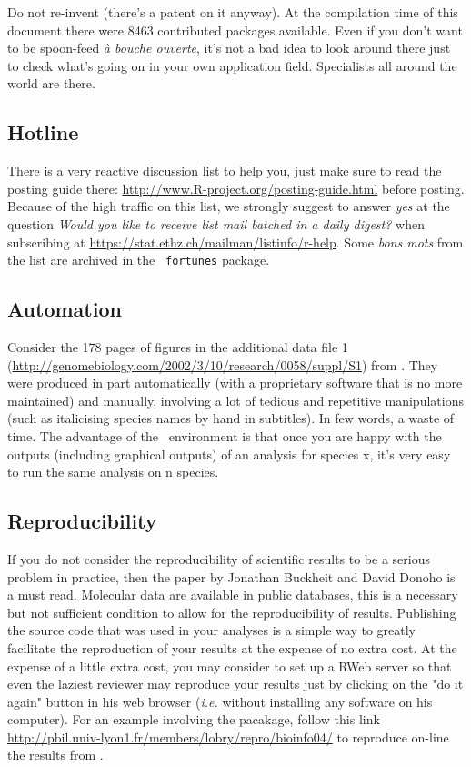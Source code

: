 \documentclass{article}
\begin{document}
Do not re-invent (there's a patent \cite{wheel} on it anyway).
At the compilation time of this document there were 
8463
contributed packages available. Even if you don't want to be spoon-feed 
\textit{{\`a} bouche ouverte}, 
it's not a bad
idea to look around there just to check what's going on in your own application field.
Specialists all around the world are there.

\subsection{Hotline}

There is a very reactive discussion list to help you, just make sure to
read the posting guide there: \url{http://www.R-project.org/posting-guide.html}
before posting. Because of the high traffic on this list, we strongly suggest to answer \emph{yes} at the
question \emph{Would you like to receive list mail batched in a daily  digest?} when
subscribing at \url{https://stat.ethz.ch/mailman/listinfo/r-help}. Some \textit{bons mots}
from the list are archived in the \Rlogo{}~\texttt{fortunes} package.

\subsection{Automation} 
Consider the 178 pages of figures in the additional data file 1
(\url{http://genomebiology.com/2002/3/10/research/0058/suppl/S1}) from \cite{lobrysueoka}. 
They were produced in part automatically (with a proprietary
software that is no more maintained) and manually, involving a lot of
tedious and repetitive manipulations (such as italicising species names by hand in subtitles).
In few words, a waste of time. The advantage of the \Rlogo{}~environment is that once you are
happy with the outputs (including graphical outputs) of an analysis for species x, it's very
easy to run the same analysis on n species. 

\subsection{Reproducibility} 
If you do not consider the reproducibility of scientific results
to be a serious problem in practice, then the paper by Jonathan Buckheit and David Donoho
\cite{repro} is a must read. Molecular data are available in public databases, this is
a necessary but not sufficient condition to allow for the reproducibility of results.
Publishing the \Rlogo{} source code that was used in your analyses is a simple way
to greatly facilitate the reproduction of your results at the expense of no extra cost. 
At the expense of a little extra cost, you may consider to set up a RWeb server
so that even the laziest reviewer may reproduce your results just by clicking on
the "do it again" button in his web browser (\textit{i.e.} without installing any
software on his computer). For an example involving the \seqinr{} pacakage, 
follow this link \url{http://pbil.univ-lyon1.fr/members/lobry/repro/bioinfo04/}
to reproduce on-line the results from \cite{fifine}.
\end{document}
